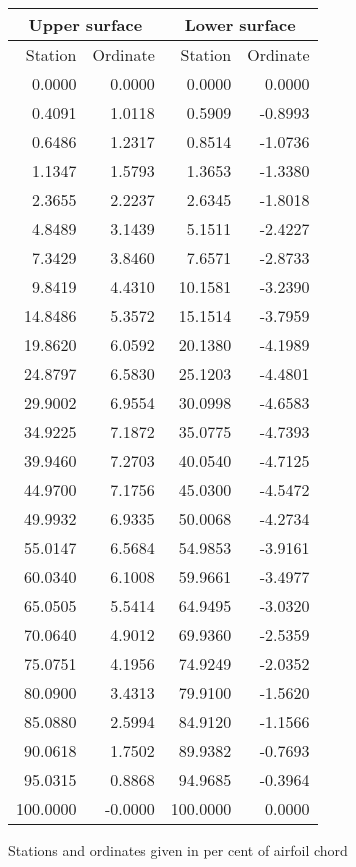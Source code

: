 \documentclass[11pt]{book}
\begin{document}
 \hspace{4mm}
 \begin{tabular}{|r|r|r|r|} \hline 
 \multicolumn{2}{|c|}{Upper surface} & \multicolumn{2}{|c|}{Lower surface} \\
 \hline
 Station & Ordinate & Station & Ordinate \\
 \hline
0.0000 & 0.0000 & 0.0000 & 0.0000 \\
0.4091 & 1.0118 & 0.5909 & -0.8993 \\
0.6486 & 1.2317 & 0.8514 & -1.0736 \\
1.1347 & 1.5793 & 1.3653 & -1.3380 \\
2.3655 & 2.2237 & 2.6345 & -1.8018 \\
4.8489 & 3.1439 & 5.1511 & -2.4227 \\
7.3429 & 3.8460 & 7.6571 & -2.8733 \\
9.8419 & 4.4310 & 10.1581 & -3.2390 \\
14.8486 & 5.3572 & 15.1514 & -3.7959 \\
19.8620 & 6.0592 & 20.1380 & -4.1989 \\
24.8797 & 6.5830 & 25.1203 & -4.4801 \\
29.9002 & 6.9554 & 30.0998 & -4.6583 \\
34.9225 & 7.1872 & 35.0775 & -4.7393 \\
39.9460 & 7.2703 & 40.0540 & -4.7125 \\
44.9700 & 7.1756 & 45.0300 & -4.5472 \\
49.9932 & 6.9335 & 50.0068 & -4.2734 \\
55.0147 & 6.5684 & 54.9853 & -3.9161 \\
60.0340 & 6.1008 & 59.9661 & -3.4977 \\
65.0505 & 5.5414 & 64.9495 & -3.0320 \\
70.0640 & 4.9012 & 69.9360 & -2.5359 \\
75.0751 & 4.1956 & 74.9249 & -2.0352 \\
80.0900 & 3.4313 & 79.9100 & -1.5620 \\
85.0880 & 2.5994 & 84.9120 & -1.1566 \\
90.0618 & 1.7502 & 89.9382 & -0.7693 \\
95.0315 & 0.8868 & 94.9685 & -0.3964 \\
100.0000 & -0.0000 & 100.0000 & 0.0000 \\
 \hline 
 \end{tabular}
 \vspace{8mm}

Stations and ordinates given in per cent of airfoil chord
\end{document}
